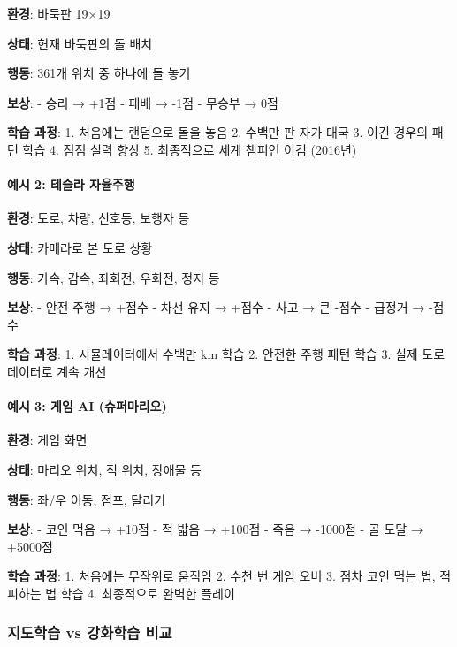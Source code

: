 \documentclass[a4paper, 11pt]{article}
\begin{document}
\textbf{환경}: 바둑판 19×19

\textbf{상태}: 현재 바둑판의 돌 배치

\textbf{행동}: 361개 위치 중 하나에 돌 놓기

\textbf{보상}: - 승리 → +1점 - 패배 → -1점 - 무승부 → 0점

\textbf{학습 과정}: 1. 처음에는 랜덤으로 돌을 놓음 2. 수백만 판 자가
대국 3. 이긴 경우의 패턴 학습 4. 점점 실력 향상 5. 최종적으로 세계
챔피언 이김 (2016년)

\hypertarget{uxc608uxc2dc-2-uxd14cuxc2acuxb77c-uxc790uxc728uxc8fcuxd589}{%
\paragraph{예시 2: 테슬라
자율주행}\label{uxc608uxc2dc-2-uxd14cuxc2acuxb77c-uxc790uxc728uxc8fcuxd589}}

\textbf{환경}: 도로, 차량, 신호등, 보행자 등

\textbf{상태}: 카메라로 본 도로 상황

\textbf{행동}: 가속, 감속, 좌회전, 우회전, 정지 등

\textbf{보상}: - 안전 주행 → +점수 - 차선 유지 → +점수 - 사고 → 큰 -점수
- 급정거 → -점수

\textbf{학습 과정}: 1. 시뮬레이터에서 수백만 km 학습 2. 안전한 주행 패턴
학습 3. 실제 도로 데이터로 계속 개선

\hypertarget{uxc608uxc2dc-3-uxac8cuxc784-ai-uxc288uxd37cuxb9c8uxb9acuxc624}{%
\paragraph{예시 3: 게임 AI
(슈퍼마리오)}\label{uxc608uxc2dc-3-uxac8cuxc784-ai-uxc288uxd37cuxb9c8uxb9acuxc624}}

\textbf{환경}: 게임 화면

\textbf{상태}: 마리오 위치, 적 위치, 장애물 등

\textbf{행동}: 좌/우 이동, 점프, 달리기

\textbf{보상}: - 코인 먹음 → +10점 - 적 밟음 → +100점 - 죽음 → -1000점 -
골 도달 → +5000점

\textbf{학습 과정}: 1. 처음에는 무작위로 움직임 2. 수천 번 게임 오버 3.
점차 코인 먹는 법, 적 피하는 법 학습 4. 최종적으로 완벽한 플레이

\hypertarget{uxc9c0uxb3c4uxd559uxc2b5-vs-uxac15uxd654uxd559uxc2b5-uxbe44uxad50}{%
\subsubsection{지도학습 vs 강화학습
비교}\label{uxc9c0uxb3c4uxd559uxc2b5-vs-uxac15uxd654uxd559uxc2b5-uxbe44uxad50}}
\end{document}
